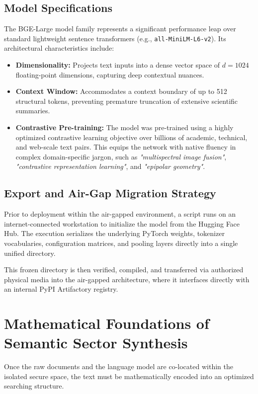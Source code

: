 \documentclass[12pt,a4paper]{article}
\begin{document}
\subsection{Model Specifications}
The BGE-Large model family represents a significant performance leap over standard lightweight sentence transformers (e.g., \texttt{all-MiniLM-L6-v2}). Its architectural characteristics include:
\begin{itemize}
    \item \textbf{Dimensionality:} Projects text inputs into a dense vector space of $d = 1024$ floating-point dimensions, capturing deep contextual nuances.
    \item \textbf{Context Window:} Accommodates a context boundary of up to 512 structural tokens, preventing premature truncation of extensive scientific summaries.
    \item \textbf{Contrastive Pre-training:} The model was pre-trained using a highly optimized contrastive learning objective over billions of academic, technical, and web-scale text pairs. This equips the network with native fluency in complex domain-specific jargon, such as \textit{"multispectral image fusion"}, \textit{"contrastive representation learning"}, and \textit{"epipolar geometry"}.
\end{itemize}

\subsection{Export and Air-Gap Migration Strategy}
Prior to deployment within the air-gapped environment, a script runs on an internet-connected workstation to initialize the model from the Hugging Face Hub. The execution serializes the underlying PyTorch weights, tokenizer vocabularies, configuration matrices, and pooling layers directly into a single unified directory. 

This frozen directory is then verified, compiled, and transferred via authorized physical media into the air-gapped architecture, where it interfaces directly with an internal PyPI Artifactory registry.

\section{Mathematical Foundations of Semantic Sector Synthesis}
Once the raw documents and the language model are co-located within the isolated secure space, the text must be mathematically encoded into an optimized searching structure.
\end{document}
